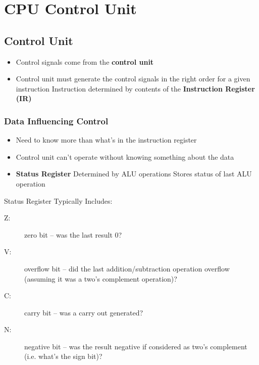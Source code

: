 \section{CPU Control Unit}
\subsection{Control Unit}
\begin{itemize}
	\item Control signals come from the \textbf{control unit}
	\item Control unit must generate the control signals in the right order for a given instruction
	\subitem Instruction determined by contents of the \textbf{Instruction Register (IR)}	
\end{itemize}

\subsubsection{Data Influencing Control}
\begin{itemize}
	\item Need to know more than what's in the instruction register
	\item Control unit can't operate without knowing something about the data
	\item \textbf{Status Register}
	\subitem Determined by ALU operations
	\subitem Stores status of last ALU operation	
\end{itemize}

\begin{note}{Status Register}
Typically Includes:
	\begin{description}
		\item[Z:] zero bit -- was the last result 0?
		\item[V:] overflow bit -- did the last addition/subtraction operation overflow (assuming it was a two's complement operation)?
		\item[C:] carry bit -- was a carry out generated?
		\item[N:] negative bit -- was the result negative if considered as two's complement (i.e. what's the sign bit)?
	\end{description}	
\end{note}
